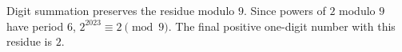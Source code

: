 Digit summation preserves the residue modulo $9$. Since powers of $2$ modulo $9$ have period $6$, $2^{2023}\equiv2\pmod9$. The final positive one-digit number with this residue is $\boxed2$.
